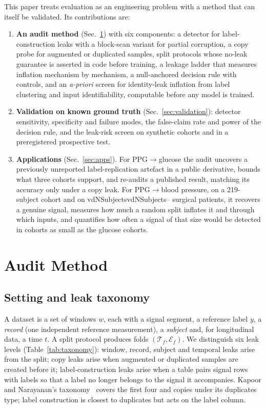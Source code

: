 \documentclass[journal]{IEEEtran}
\newcommand{\m}[1]{\ifcsname #1\endcsname\csname #1\endcsname\else\textcolor{red}{--}\fi}
\begin{document}
This paper treats evaluation as an engineering problem with a method that can
itself be validated.  Its contributions are:
\begin{enumerate}
  \item \textbf{An audit method} (Sec.~\ref{sec:method}) with six
        components: a detector for label-construction leaks with a block-scan
        variant for partial corruption, a copy probe for augmented or
        duplicated samples, split protocols whose no-leak guarantee is
        asserted in code before training, a leakage ladder that measures
        inflation mechanism by mechanism, a null-anchored decision rule
        with controls, and an \emph{a-priori} screen for identity-leak
        inflation from label clustering and input identifiability,
        computable before any model is trained.
  \item \textbf{Validation on known ground truth} (Sec.~\ref{sec:validation}):
        detector sensitivity, specificity and failure modes, the false-claim
        rate and power of the decision rule, and the leak-risk screen on
        synthetic cohorts and in a preregistered prospective test.
  \item \textbf{Applications} (Sec.~\ref{sec:apps}).  For PPG$\to$glucose
        the audit uncovers a previously unreported label-replication artefact
        in a public derivative, bounds what three cohorts support, and
        re-audits a published result, matching its accuracy only under a
        copy leak.  For PPG$\to$blood pressure, on a 219-subject cohort and on
        \m{vdNSubjects} surgical patients, it recovers a genuine signal,
        measures how much a random split inflates it and through which
        inputs, and quantifies how often a signal of that size would be
        detected in cohorts as small as the glucose cohorts.
\end{enumerate}

\section{Audit Method}
\label{sec:method}

\subsection{Setting and leak taxonomy}
A dataset is a set of windows $w$, each with a signal segment, a reference
label $y$, a \emph{record} (one independent reference measurement), a
\emph{subject} and, for longitudinal data, a time $t$.  A split protocol
produces folds $(\mathcal{T}_f,\mathcal{E}_f)$.  We distinguish six leak
levels (Table~\ref{tab:taxonomy}): window, record, subject and temporal leaks
arise from the split; copy leaks arise when augmented or duplicated samples
are created before it; label-construction leaks arise when a table pairs
signal rows with labels so that a label no longer belongs to the signal it
accompanies.  Kapoor and Narayanan's taxonomy~\cite{kapoor2023leakage}
covers the first four and copies under its duplicates type; label
construction is closest to duplicates but acts on the label column.
\end{document}
